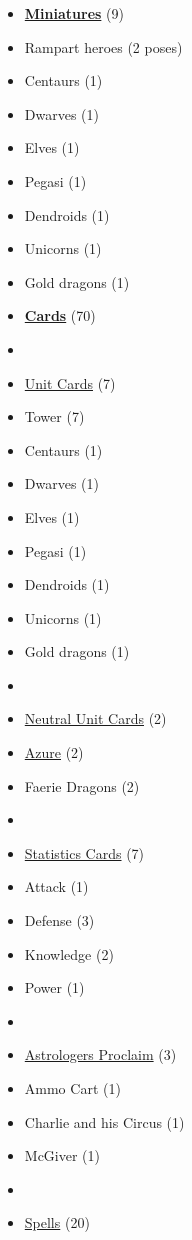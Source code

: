 \begin{multicols}{3}
\begin{itemize}[leftmargin=0pt, label={}, noitemsep, noitemsep]
  \item \textbf{\underline{Miniatures}} (9)
  \item Rampart heroes (2 poses)
  \item Centaurs (1)
  \item Dwarves (1)
  \item Elves (1)
  \item Pegasi (1)
  \item Dendroids (1)
  \item Unicorns (1)
  \item Gold dragons (1)
\end{itemize}

\begin{itemize}[leftmargin=0pt, label={}, noitemsep, noitemsep]
  \item \textbf{\underline{Cards}} (70)
  \item
  \item \underline{Unit Cards} (7)
  \item Tower (7)
  \item Centaurs (1)
  \item Dwarves (1)
  \item Elves (1)
  \item Pegasi (1)
  \item Dendroids (1)
  \item Unicorns (1)
  \item Gold dragons (1)
  \item
  \item \underline{Neutral Unit Cards} (2)
  \item \underline{Azure} (2)
  \item Faerie Dragons (2)
  \item
  \item \underline{Statistics Cards} (7)
  \item Attack (1)
  \item Defense (3)
  \item Knowledge (2)
  \item Power (1)
  \item
  \item \underline{Astrologers Proclaim} (3)
  \item Ammo Cart (1)
  \item Charlie and his Circus (1)
  \item McGiver (1)
  \item
  \item \underline{Spells} (20)

\end{itemize}
\end{multicols}
